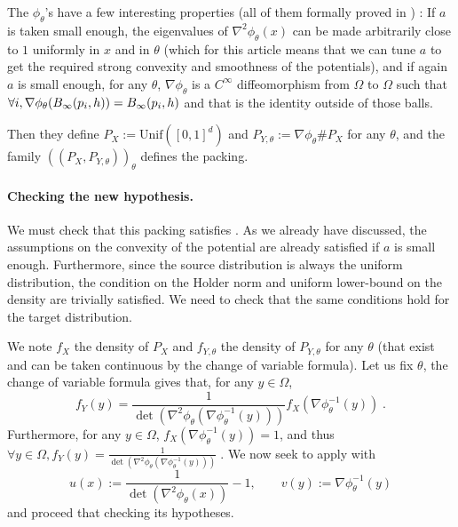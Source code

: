 \documentclass{article}
\newcommand{\1}{\mathds{1}}
\DeclarePairedDelimiter{\paren}{\lparen}{\rparen}
\theoremstyle{plain}
\theoremstyle{definition}
\theoremstyle{remark}
\begin{document}
The $\phi_{\theta}$'s have a few interesting properties (all of them formally proved in \cite{lalanne2025PrivateOTMaps}) : If $a$ is taken small enough, the eigenvalues of $\nabla^2 \phi_{\theta}(x)$ can be made arbitrarily close to $1$ uniformly in $x$ and in $\theta$ (which for this article means that we can tune $a$ to get the required strong convexity and smoothness of the potentials), and if again $a$ is small enough, for any $\theta$, $\nabla \phi_{\theta}$ is a $C^{\infty}$ diffeomorphism from $\Omega$ to $\Omega$ such that $\forall i, \nabla \phi_{\theta} \paren*{B_{\infty}\paren*{p_i, h}} = B_{\infty}\paren*{p_i, h}$ and that is the identity outside of those balls.

Then they define $P_X := \textrm{Unif}([0, 1]^d)$ and $P_{Y, \theta} := \nabla \phi_{\theta} \# P_X$ for any $\theta$, and the family $((P_X, P_{Y, \theta}))_{\theta}$ defines the packing.

\paragraph{Checking the new hypothesis.}

We must check that this packing satisfies . As we already have discussed, the assumptions on the convexity of the potential are already satisfied if $a$ is small enough. Furthermore, since the source distribution is always the uniform distribution, the condition on the Holder norm and uniform lower-bound on the density are trivially satisfied. We need to check that the same conditions hold for the target distribution.

We note $f_X$ the density of $P_X$ and $f_{Y, \theta}$ the density of $P_{Y, \theta}$ for any $\theta$ (that exist and can be taken continuous by the change of variable formula).
Let us fix $\theta$, the change of variable formula gives that, for any $y \in \Omega$, 
\begin{equation}
    f_Y(y) = \frac{1}{\det (\nabla^2 \phi_{\theta}(\nabla \phi_{\theta}^{-1}(y)))} f_X(\nabla \phi_{\theta}^{-1}(y)) \;.
\end{equation}
Furthermore, for any $y \in \Omega$, $f_X(\nabla \phi_{\theta}^{-1}(y)) = 1$, and thus 
$
    \forall y \in \Omega, f_Y(y) = \frac{1}{\det (\nabla^2 \phi_{\theta}(\nabla \phi_{\theta}^{-1}(y)))} \;.
$
We now seek to apply  with
\begin{equation}
    u(x) := \frac{1}{\det(\nabla^2 \phi_\theta(x))} - 1,
\qquad
v(y) := \nabla \phi_\theta^{-1}(y)
\end{equation}
and proceed that checking its hypotheses.
\end{document}
